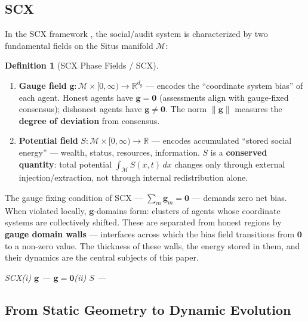 \documentclass[12pt,a4paper]{article}
\theoremstyle{plain}
\theoremstyle{definition}
\newtheorem{definition}[theorem]{ Definition}
\newcommand{\R}{\mathbb{R}}
\newcommand{\cM}{\mathcal{M}}
\newcommand{\gf}{\mathbf{g}}          %
\newcommand{\Sf}{S}                   %
\newcommand{\cn}[1]{\textcolor{scxgray}{\textit{#1}}}
\begin{document}
\subsection*{SCX}

In the SCX framework \cite{scx_framework, scx_moe_gauge}, the social/audit
system is characterized by two fundamental fields on the Situs manifold $\cM$:

\begin{definition}[SCX Phase Fields / SCX]
\label{def:phase_fields}
\begin{enumerate}[label=(\roman*)]
    \item \textbf{Gauge field} $\gf: \cM \times [0,\infty) \to \R^{d_g}$ —
    encodes the ``coordinate system bias'' of each agent. Honest agents have
    $\gf = \mathbf{0}$ (assessments align with gauge-fixed consensus);
    dishonest agents have $\gf \neq \mathbf{0}$. The norm $\|\gf\|$ measures
    the \textbf{degree of deviation} from consensus.

    \item \textbf{Potential field} $\Sf: \cM \times [0,\infty) \to \R$ —
    encodes accumulated ``stored social energy'' — wealth, status, resources,
    information. $\Sf$ is a \textbf{conserved quantity}: total potential
    $\int_\cM \Sf(x,t)\,dx$ changes only through external injection/extraction,
    not through internal redistribution alone.
\end{enumerate}
\end{definition}

The gauge fixing condition of SCX — $\sum_m \gf_m = \mathbf{0}$ — demands zero
net bias. When violated locally, $\gf$-domains form: clusters of agents whose
coordinate systems are collectively shifted. These are separated from honest
regions by \textbf{gauge domain walls} — interfaces across which the bias
field transitions from $\mathbf{0}$ to a non-zero value. The thickness of
these walls, the energy stored in them, and their dynamics are the central
subjects of this paper.

\bigskip
\noindent
\cn{SCX(i)  $\gf$ —  $\gf=\mathbf{0}$(ii)  $\Sf$ — }

\subsection{From Static Geometry to Dynamic Evolution}
\subsection*{}
\end{document}

